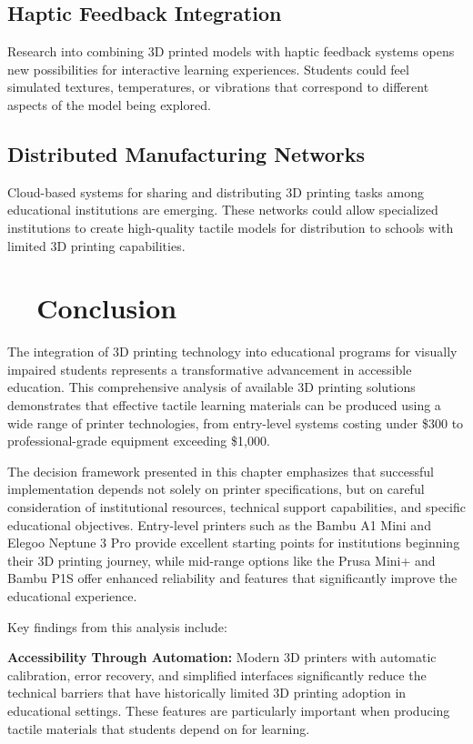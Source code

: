 \subsection{Haptic Feedback Integration}
Research into combining 3D printed models with haptic feedback systems opens new possibilities for interactive learning experiences. Students could feel simulated textures, temperatures, or vibrations that correspond to different aspects of the model being explored.

\subsection{Distributed Manufacturing Networks}
Cloud-based systems for sharing and distributing 3D printing tasks among educational institutions are emerging. These networks could allow specialized institutions to create high-quality tactile models for distribution to schools with limited 3D printing capabilities.

\section{~~Conclusion}\label{ch5:sec:conclusion}

The integration of 3D printing technology into educational programs for visually impaired students represents a transformative advancement in accessible education. This comprehensive analysis of available 3D printing solutions demonstrates that effective tactile learning materials can be produced using a wide range of printer technologies, from entry-level systems costing under \$300 to professional-grade equipment exceeding \$1,000.

The decision framework presented in this chapter emphasizes that successful implementation depends not solely on printer specifications, but on careful consideration of institutional resources, technical support capabilities, and specific educational objectives. Entry-level printers such as the Bambu A1 Mini and Elegoo Neptune 3 Pro provide excellent starting points for institutions beginning their 3D printing journey, while mid-range options like the Prusa Mini+ and Bambu P1S offer enhanced reliability and features that significantly improve the educational experience.

Key findings from this analysis include:

\textbf{Accessibility Through Automation:} Modern 3D printers with automatic calibration, error recovery, and simplified interfaces significantly reduce the technical barriers that have historically limited 3D printing adoption in educational settings. These features are particularly important when producing tactile materials that students depend on for learning.


